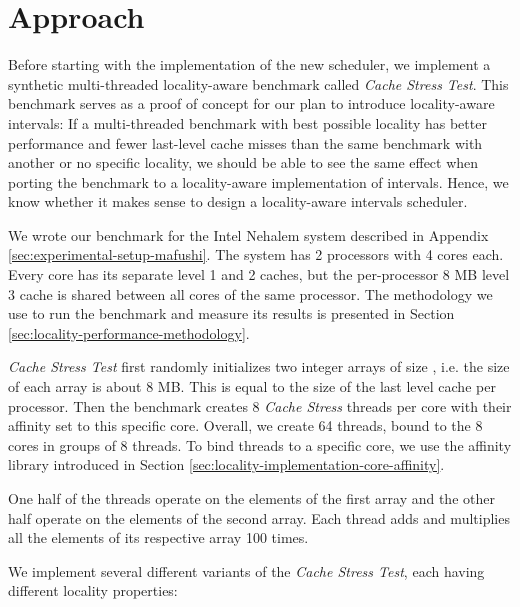 
\chapter{Approach}
\label{chap:locality-approach}

Before starting with the implementation of the new scheduler, we
implement a synthetic multi-threaded locality-aware benchmark called
\emph{Cache Stress Test}. This benchmark serves as a proof of concept
for our plan to introduce locality-aware intervals: If a
multi-threaded benchmark with best possible locality has better
performance and fewer last-level cache misses than the same benchmark
with another or no specific locality, we should be able to see the
same effect when porting the benchmark to a locality-aware
implementation of intervals. Hence, we know whether it makes sense to
design a locality-aware intervals scheduler.

We wrote our benchmark for the Intel Nehalem system described in
Appendix \ref{sec:experimental-setup-mafushi}. The system has 2
processors with 4 cores each. Every core has its separate level 1 and
2 caches, but the per-processor 8 MB level 3 cache is shared between
all cores of the same processor. The methodology we use to run the
benchmark and measure its results is presented in Section
\ref{sec:locality-performance-methodology}.

\emph{Cache Stress Test} first randomly initializes two integer arrays
of size , i.e. the size of each array is about 8
MB. This is equal to the size of the last level cache per
processor. Then the benchmark creates 8 \emph{Cache Stress} threads
per core with their affinity set to this specific core. Overall, we
create 64 threads, bound to the 8 cores in groups of 8 threads. To
bind threads to a specific core, we use the affinity library
introduced in Section \ref{sec:locality-implementation-core-affinity}.

One half of the threads operate on the elements of the first array and
the other half operate on the elements of the second array. Each
thread adds and multiplies all the elements of its respective array
100 times.

We implement several different variants of the \emph{Cache Stress
  Test}, each having different locality properties:

